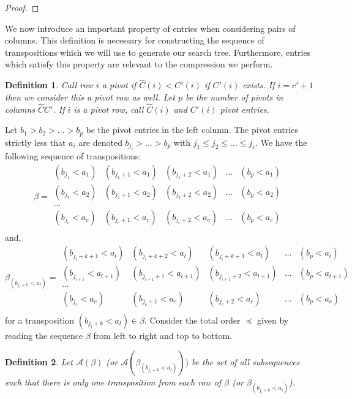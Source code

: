 \documentclass[11pt]{amsart}
\newtheorem{definition}{Definition}[section]
\begin{document}
{\begin{proof}
\end{proof}
\indent We now introduce an important property of entries when considering pairs of columns. This definition is necessary for constructing the sequence of transpositions which we will use to generate our search tree. Furthermore, entries which satisfy this property are relevant to the compression we perform. 
\begin{definition}
Call row $i$ a \emph{pivot} if $\widehat{C}(i)<C'(i)$ if $C'(i)$ exists. If $i=c'+1$ then we consider this a pivot row as well. Let $p$ be the number of pivots in columns  $\widehat{C}C'$. If $i$ is a pivot row, call $\widehat{C}(i)$ and $C'(i)$ \emph{pivot entries}.
\end{definition} 
 Let $b_{1}>b_{2}>\ldots >b_{p}$ be the pivot entries in the left column. The pivot entries strictly less that $a_{i}$ are denoted $b_{j_i}>\ldots > b_{p}$ with $j_{1} \leq j_{2} \leq \ldots\leq j_{c}$. We have the following sequence of transpositions:
\[
\beta=
\begin{matrix}
(b_{j_1}<a_{1}) & (b_{j_{1}+1}<a_{1}) & (b_{j_1+2}<a_{1}) &\ldots & (b_{p}<a_{1})\\
(b_{j_2}<a_{2}) & (b_{j_{2}+1}<a_{2}) & (b_{j_2+2}<a_{2}) &\ldots & (b_{p}<a_{2})\\
\ldots \\
(b_{j_c}<a_{c}) & (b_{j_{c}+1}<a_{c}) & (b_{j_c+2}<a_{c}) &\ldots & (b_{p}<a_{c})\\
\end{matrix}
\]
and, 
\[
\beta_{(b_{j_i+k}<a_{l})}=
\begin{matrix}
(b_{j_{i}+k+1}<a_{l}) & (b_{j_{i}+k+2}<a_{l}) & (b_{j_{i}+k+3}<a_{l}) &\ldots & (b_{p}<a_{l})\\
(b_{j_{i+1}}<a_{l+1}) & (b_{j_{i+1}+1}<a_{l+1}) & (b_{j_{i+1}+2}<a_{l+1}) &\ldots & (b_{p}<a_{l+1})\\
\ldots \\
(b_{j_c}<a_{c}) & (b_{j_{c}+1}<a_{c}) & (b_{j_c+2}<a_{c}) &\ldots & (b_{p}<a_{c})\\
\end{matrix}
\]
for a transposition $(b_{j_i+k}<a_{l}) \in \beta$. Consider the total order $\preceq$ given by reading the sequence $\beta$ from left to right and top to bottom. 
\begin{definition}
Let $\mathcal{A}(\beta)$ (or $\mathcal{A}(\beta_{(b_{j_i+k}<a_{l})}))$ be the set of all subsequences such that there is only one transposition from each row of $\beta$ (or $\beta_{(b_{j_i+k}<a_{i})}$). 
\end{definition}
}
\end{document}
